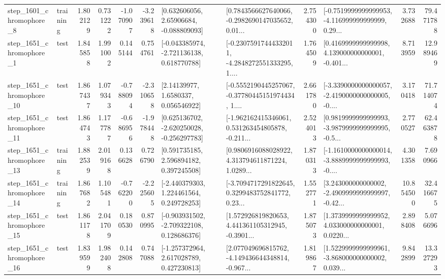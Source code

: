 \begin{tabular}{llrrrrllrlrr}
  step\_1601\_chromophore\_8 &  training &      1.802129 &    0.731222 &     -1.070907 & -3.239618 &     [0.632606056, 2.65906684, -0.088809093] &  [0.7843566627640066, -0.2982690147035652, 0.01... &       2.754300 &  [-0.7519999999999953, -4.116999999999999, 0.29... &            3.732688 &         79.471788 \\
  step\_1651\_chromophore\_1 &      test &      1.845858 &    1.991002 &      0.145144 &  0.754761 &   [-0.043385974, -2.721136138, 0.618770788] &  [-0.23075917444332011, -4.2848272551333295, 1.... &       1.764509 &  [0.4169999999999998, 4.139000000000001, -0.401... &            8.713959 &         12.989469 \\
 step\_1651\_chromophore\_10 &      test &      1.867437 &    1.079343 &     -0.788094 & -2.310658 &        [2.14139977, 1.6580337, 0.056546922] &  [-0.5552190445257067, -0.37780445151974434, 1.... &       2.661780 &  [-3.3390000000000057, -2.4190000000000005, -0.... &            3.170418 &         71.714074 \\
 step\_1651\_chromophore\_11 &      test &      1.864743 &    1.177787 &     -0.686956 & -1.978448 &   [0.625136702, -2.620250028, -0.256297783] &  [-1.962162415346061, 0.531263454805878, -0.211... &       2.524013 &  [0.9819999999999993, -3.9879999999999995, -0.5... &            2.770527 &         62.463878 \\
 step\_1651\_chromophore\_13 &  training &      1.882539 &    2.019168 &      0.136628 &  0.726790 &     [0.591735185, 2.596894182, 0.397245508] &  [0.9806916088028922, 4.313794611871224, 1.0289... &       1.870313 &  [-1.1610000000000014, -3.8889999999999993, -0.... &            4.301358 &          7.690966 \\
 step\_1651\_chromophore\_14 &  training &      1.867682 &    1.105481 &     -0.762200 & -2.225605 &    [-2.440379303, 1.224461564, 0.249728253] &  [-3.7094717291822645, 0.3299483752841772, 0.23... &       1.552771 &  [3.243000000000002, -2.4909999999999997, -0.42... &           10.854500 &         32.416675 \\
 step\_1651\_chromophore\_15 &      test &      1.861178 &    2.041709 &      0.180530 &  0.870995 &   [-0.903931502, -2.709322108, 0.128686376] &  [1.572926819820653, 4.441361105312945, -0.3901... &       1.875073 &  [1.3739999999999952, 4.033000000000001, 0.0220... &            2.898408 &          5.076696 \\
 step\_1651\_chromophore\_16 &      test &      1.839599 &    1.982408 &      0.142808 &  0.747088 &    [-1.257372964, 2.617028789, 0.427230813] &  [2.077049696815762, -4.149436644348814, -0.967... &       1.819867 &  [1.5229999999999961, -3.868000000000002, 0.039... &            9.842899 &         13.327293 \\

\end{tabular}
